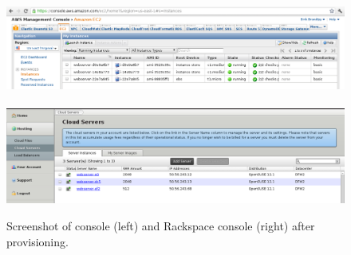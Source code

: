 \begin{figure}[tb]
  \begin{center}
    \includegraphics[width=20cm, angle=90]{imgs/aws-console.png}
    ~ ~ ~
    ~ ~ ~
    \includegraphics[width=20cm, angle=90]{imgs/rackspace-console.png}
    \caption{Screenshot of  console (left) and Rackspace console (right) after provisioning.}
  \end{center}
  \label{fig:validation-aws}
\end{figure}
